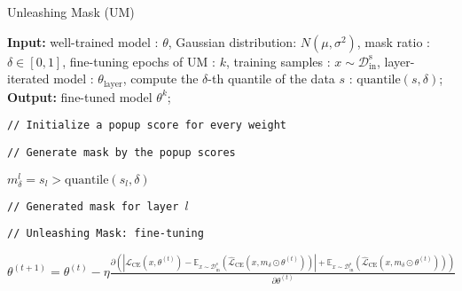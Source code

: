 \documentclass{article}
\theoremstyle{plain}
\theoremstyle{definition}
\theoremstyle{remark}
\begin{document}
\begin{algorithm}[h!]
\caption{Unleashing Mask (UM)}
   \label{alg:um}
   {\bf Input:} well-trained model : $\theta$, Gaussian distribution: $N(\mu, \sigma^2)$, mask ratio : $\delta \in [0, 1]$, fine-tuning epochs of UM : $k$, training samples : $x \sim \mathcal{D}^\text{s}_\text{in}$, layer-iterated model : $\theta_{\text{layer}}$, compute the $\delta$-th quantile of the data $s$ : $\text{quantile}(s, \delta)$;\\
   {\bf Output:} fine-tuned model $\theta^k$;
\begin{algorithmic}[1]
\STATE \begin{footnotesize}\texttt{// Initialize a popup score for every weight}\end{footnotesize}\vspace{2mm}
    \ENDFOR\vspace{2mm}
\STATE \begin{footnotesize}\texttt{// Generate mask by the popup scores}\end{footnotesize}\vspace{2mm}
        \STATE $m_\delta^l = s_l > \text{quantile}(s_l, \delta)$ \begin{footnotesize}\texttt{// Generated mask for layer $l$}\end{footnotesize}
    \ENDFOR\vspace{2mm}
\STATE \begin{footnotesize}\texttt{// Unleashing Mask: fine-tuning}\end{footnotesize}\vspace{2mm}
        \STATE $\theta^{(t + 1)} = \theta^{(t)} - \eta \frac{\partial(|\mathcal{L}_{\text{CE}}(x, \theta^{(t)}) - \mathbb{E}_{x \sim \mathcal{D}^\text{s}_\text{in}}(\hat{\mathcal{L}}_{\text{CE}}(x, m_\delta \odot \theta^{(t)}))| + \mathbb{E}_{x \sim \mathcal{D}^\text{s}_\text{in}}(\hat{\mathcal{L}}_{\text{CE}}(x, m_\delta \odot \theta^{(t)})))}{\partial\theta^{(t)}}$
    \ENDFOR
\end{algorithmic}
\end{algorithm}
\end{document}
